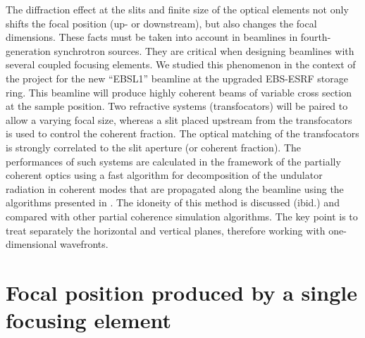 \documentclass[9pt,twocolumn,twoside]{osajnl}
\begin{document}
The diffraction effect at the slits and finite size of the optical elements not only shifts the focal position (up- or downstream), but also changes the focal dimensions. These facts must be taken into account in beamlines in fourth-generation synchrotron sources. They are critical when designing beamlines with several coupled focusing elements. We studied this phenomenon in the context of the project for the new ``EBSL1'' beamline at the upgraded EBS-ESRF storage ring. This beamline will produce highly coherent beams of variable cross section at the sample position. Two refractive systems (transfocators) will be paired to allow a varying focal size, whereas a slit placed upstream from the transfocators is used to control the coherent fraction. The optical matching of the transfocators is strongly correlated to the slit aperture (or coherent fraction). The performances of such systems are calculated in the framework of the partially coherent optics using a fast algorithm for decomposition of the undulator radiation in coherent modes that are propagated along the beamline using the algorithms presented in \cite{delrio2021pairing}. The idoneity of this method is discussed (ibid.) and compared with other partial coherence simulation algorithms. The key point is to treat separately the horizontal and vertical planes, therefore working with one-dimensional wavefronts.

\section{Focal position produced by a single focusing element}
\label{sec:onelens}
\end{document}
